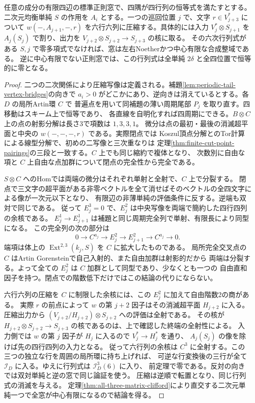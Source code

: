 \begin{corollary}\label{cor:binary-simple-sextic-determinant}
任意の成分の有限四辺の標準正則窓で、四隅が四行列の恒等式を満たすとする。
二次元均衡単純 $S$ の作用を $A_i$ とする。一つの巡回位置 $j$ で、文字 $r\in V_{j+3}^*$ について
$w(-,A_{j+1},-,r)$ を六行六列に圧縮する。具体的には入力 $V_j^*\otimes S_{j+1}$ を
$A_j(S_j)$ で割り、出力を $V_{j+2}\otimes S_{j+2}\to S_{j+3}$ の核に取る。
その六次行列式がある $S,j$ で零多項式でなければ、窓は左右Noetherかつ中心有限な合成整域である。
逆に中心有限でない正則窓では、この行列式は全単純 $2\delta$ と全四位置で恒等的に零となる。
\end{corollary}
\begin{proof}
二つの二次関係により圧縮写像は定義される。補題\ref{lem:periodic-tail-vertex-bridges}の向きで
$a_i>0$ がどこかにあり、逆向きは消えているとする。各 $D$ の局所Artin環 $C$ で
普遍点を用いて同補題の薄い周期尾部 $P_j$ を取り直す。四移動はスキーム上で恒等であり、
各直線を自明化すれば四周期にできる。$B\otimes C$ 上の点の射影分解は長さ3で項数は $1,3,3,1$。
微分は点の最初・最後の消滅超平面と中央の $w(-,-,-,r)$ である。実際閉点では
Koszul頂点分解とのTor計算による線型分解で、初めの二写像と三次重なりは
定理\ref{thm:finite-cut-point-pairings}の三段と一致する。$C$ 上でも同じ縮約で複体となり、
次数別に自由な項と $C$ 上自由な点加群について閉点の完全性から完全である。

$S\otimes C$ へのHomでは両端の微分はそれぞれ単射と全射で、$C$ 上で分裂する。
閉点で三文字の超平面がある非零ベクトルを全て消せばそのベクトルの全四文字による像が一次元以下となり、
有限辺の非薄単純の評価条件に反する。逆端も双対で同じである。
従って $E_j^3=0$ で、$E_j^2$ は中央写像を両端で簡約した四行四列の余核である。
$E_j^1\to E_{j+1}^1$ は補題と同じ周期完全列で単射、有限長により同型になる。
この完全列の次の部分は
\[
  0\to C^{a_j}\to E_j^2\to E_{j+1}^2\to C^{a_j}\to0 .
\]
端項は体上の $\operatorname{Ext}^{2,3}(k_j,S)$ を $C$ に拡大したものである。
局所完全交叉点の $C$ はArtin Gorensteinで自己入射的、また自由加群は射影的だから
両端は分裂する。よって全ての $E_j^2$ は $C$ 加群として同型であり、少なくとも一つの
自由直和因子を持つ。閉点での階数低下だけではこの結論の代りにならない。

六行六列の圧縮を $C$ に制限した余核には、この $E_j^2$ に加えて自由階数2の商がある。
実際 $r$ の前点によって $w$ の第 $j+2$ 因子はその消滅超平面 $H_{j+2}$ に入る。
圧縮出力から $(V_{j+2}/H_{j+2})\otimes S_{j+2}$ への評価は全射である。
その核が $H_{j+2}\otimes S_{j+2}\to S_{j+3}$ の核であるのは、上で確認した終端の全射性による。
入力側では $w$ の第 $j$ 因子が $H_j$ に入るので $V_j^*\to H_j^*$ を通り、
$A_j(S_j)$ の像を除けば先の四行四列の入力となる。
従って六行列の余核は $C^3$ に全射する。この三つの独立な行を周囲の局所環に持ち上げれば、
可逆な行変換後の三行が全て $\mathcal I_D$ に入る。ゆえに行列式は $\mathcal I_D^3(6)$ に入り、
前定理で零である。反対の向きでは双対単純と逆の窓で同じ論証を使う。
圧縮は逆順で転置となり、同じ行列式の消滅を与える。
定理\ref{thm:all-three-matrix-clifford}により直交する二次元単純一つで全窓が中心有限になるので結論を得る。
\end{proof}
